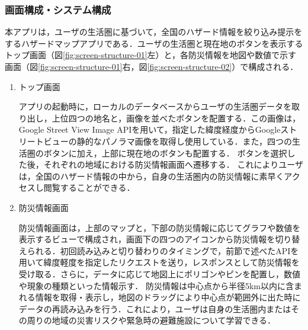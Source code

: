 \documentclass[a4paper]{jsarticle}
\begin{document}
\subsubsection{画面構成・システム構成}
本アプリは，ユーザの生活圏に基づいて，全国のハザード情報を絞り込み提示をするハザードマップアプリである．ユーザの生活圏と現在地のボタンを表示するトップ画面（図\ref{fig:screen-structure-01}左）と，各防災情報を地図や数値で示す画面（図\ref{fig:screen-structure-01}右，図\ref{fig:screen-structure-02}）で構成される．


\begin{enumerate}
  \item トップ画面

  アプリの起動時に，ローカルのデータベースからユーザの生活圏データを取り出し，上位四つの地名と，画像を並べたボタンを配置する．この画像は，Google Street View Image APIを用いて，指定した緯度経度からGoogleストリートビューの静的なパノラマ画像を取得し使用している．また，四つの生活圏のボタンに加え，上部に現在地のボタンも配置する．
  ボタンを選択した後，それぞれの地域における防災情報画面へ遷移する．
  これによりユーザは，全国のハザード情報の中から，自身の生活圏内の防災情報に素早くアクセスし閲覧することができる．

  \item 防災情報画面

  防災情報画面は，上部のマップと，下部の防災情報に応じてグラフや数値を表示するビューで構成され，画面下の四つのアイコンから防災情報を切り替えられる．初回読み込みと切り替わりのタイミングで，前節で述べたAPIを用いて緯度軽度を指定したリクエストを送り，レスポンスとして防災情報を受け取る．さらに，データに応じて地図上にポリゴンやピンを配置し，数値や現象の種類といった情報示す．
  防災情報は中心点から半径5km以内に含まれる情報を取得・表示し，地図のドラッグにより中心点が範囲外に出た時にデータの再読み込みを行う．これにより，ユーザは自身の生活圏内またはその周りの地域の災害リスクや緊急時の避難施設について学習できる．
\end{enumerate}
\end{document}
